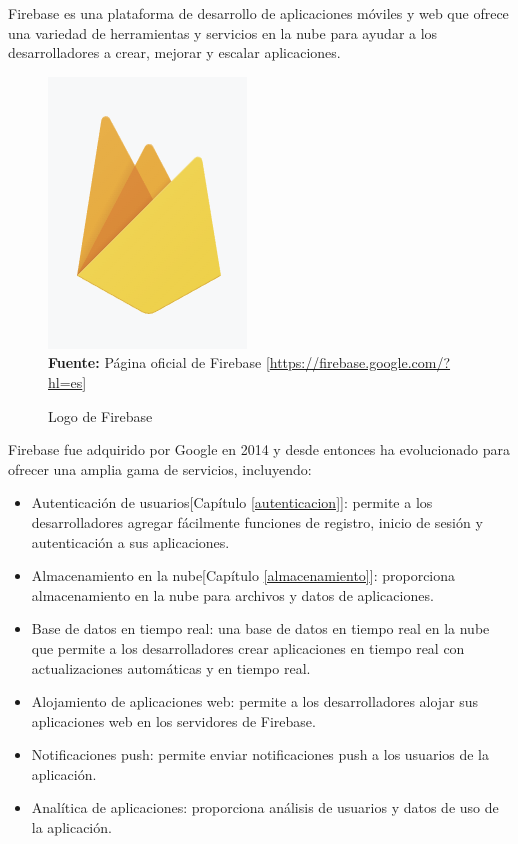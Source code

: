 Firebase es una plataforma de desarrollo de aplicaciones móviles y web que
ofrece una variedad de herramientas y servicios en la nube para ayudar a los
desarrolladores a crear, mejorar y escalar aplicaciones.
\begin{figure}[htb!]
    \centering
    \caption{Logo de Firebase}
    \label{fig:firebase-logo}
    \centering
    \includegraphics[scale=0.35]{./Ilustraciones/logos/Firebase.png}\\
    \textbf{Fuente:} Página oficial de Firebase [\url{https://firebase.google.com/?hl=es}]
\end{figure}
\hfill \break
Firebase fue adquirido por Google en 2014 y desde entonces ha evolucionado para
ofrecer una amplia gama de servicios, incluyendo:
\begin{itemize}
    \item Autenticación de usuarios[Capítulo \ref{autenticacion}]: permite a los
          desarrolladores agregar fácilmente funciones de registro, inicio de sesión y
          autenticación a sus aplicaciones.
    \item Almacenamiento en la nube[Capítulo \ref{almacenamiento}]: proporciona
          almacenamiento en la nube para archivos y datos de aplicaciones.
    \item Base de datos en tiempo real: una base de datos en tiempo real en la nube que
          permite a los desarrolladores crear aplicaciones en tiempo real con
          actualizaciones automáticas y en tiempo real.
    \item Alojamiento de aplicaciones web: permite a los desarrolladores alojar sus
          aplicaciones web en los servidores de Firebase.
    \item Notificaciones push: permite enviar notificaciones push a los usuarios de la
          aplicación.
    \item Analítica de aplicaciones: proporciona análisis de usuarios y datos de uso de
          la aplicación.
\end{itemize}


